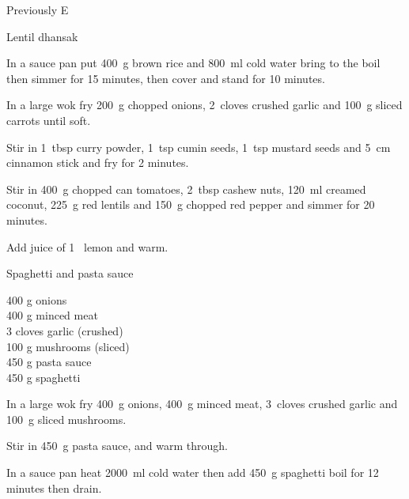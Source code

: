 \begin{menu}{Previously E}
\begin{recipe}{2}{Lentil dhansak}
\begin{ingredients}
		\end{ingredients}
	
	
    \begin{instructions}
    \item 
      In a
      sauce pan
      put
      400~g  brown rice
      and
      800~ml  cold water
      bring to the boil then simmer for 15 minutes,
      then cover and stand for 10 minutes.
    \item 
        In a large wok fry
        200~g chopped onions,
        2~cloves crushed garlic
        and
        100~g sliced carrots
        until soft.
      \item 
        Stir in
        1~tbsp  curry powder,
        1~tsp  cumin seeds,
        1~tsp  mustard seeds
        and
        5~cm  cinnamon stick
        and fry for 2 minutes.
      \item 
        Stir in
        400~g chopped can tomatoes,
        2~tbsp  cashew nuts,
        120~ml  creamed coconut,
        225~g  red lentils
        and
        150~g chopped red pepper
        and simmer for 20 minutes.
      \item 
        Add juice of
        1~  lemon
        and warm.
      
    \end{instructions}
    \end{recipe}%
  
    \begin{recipe}{2}{Spaghetti and pasta sauce}%
    
		\begin{ingredients}
		400 g onions  \\
	400 g minced meat  \\
	3 cloves garlic (crushed) \\
	100 g mushrooms (sliced) \\
	450 g pasta sauce  \\
	450 g spaghetti  \\
	
		\end{ingredients}
	
	
    \begin{instructions}
    \item 
        In a large wok fry
        400~g  onions,
        400~g  minced meat,
        3~cloves crushed garlic
        and
        100~g sliced mushrooms.
      \item 
        Stir in
        450~g  pasta sauce,
        and warm through.
      \item 
      In a sauce pan heat
      2000~ml  cold water then add
      450~g  spaghetti
      boil for 12
      minutes then drain.
    

\end{instructions}
\end{recipe}
\end{menu}
